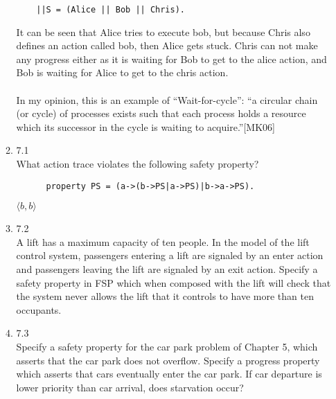 \documentclass{article}
\begin{document}
\begin{enumerate}
\begin{enumerate}
\begin{verbatim}
    ||S = (Alice || Bob || Chris).
\end{verbatim}
    It can be seen that Alice tries to execute bob, but because Chris also defines an action called bob, then Alice gets stuck.
    Chris can not make any progress either as it is waiting for Bob to get to the alice action, and Bob is waiting for Alice to get to the chris action. \\
    \\
    In my opinion, this is an example of ``Wait-for-cycle'': ``a circular chain (or cycle) of processes exists such that each process holds a resource which its successor in the cycle is waiting to acquire.''[MK06]\\
  \item 7.1 \\
    What action trace violates the following safety property?
    \begin{verbatim}
      property PS = (a->(b->PS|a->PS)|b->a->PS). 
   \end{verbatim}
   $\langle b, b \rangle$ \\ 
  \item 7.2 \\
   A lift has a maximum capacity of ten people. In the model of the lift control system, passengers entering a lift are signaled by an enter action and passengers leaving the lift are signaled by an exit action. Specify a safety property in FSP which when composed with the lift will check that the system never allows the lift that it controls to have more than ten occupants. \\
  \item 7.3 \\
   Specify a safety property for the car park problem of Chapter 5, which asserts that the car park does not overflow. Specify a progress property which asserts that cars eventually enter the car park. If car departure is lower priority than car arrival, does starvation occur? \\
\end{enumerate}


\end{enumerate}
\end{document}
